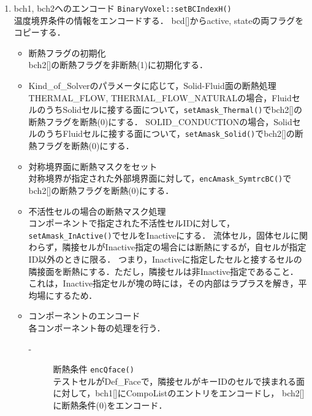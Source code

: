 \begin{enumerate}
%
\vspace{2mm}

\item bch1, bch2へのエンコード \verb|BinaryVoxel::setBCIndexH()|\\
温度境界条件の情報をエンコードする．
bcd[]からactive, stateの両フラグをコピーする．
\vspace{2mm}

\begin{itemize}
\item 断熱フラグの初期化\\
bch2[]の断熱フラグを非断熱(1)に初期化する．
\vspace{2mm}

\item Kind\_of\_Solverのパラメータに応じて，Solid-Fluid面の断熱処理\\
THERMAL\_FLOW, THERMAL\_FLOW\_NATURALの場合，FluidセルのうちSolidセルに接する面について，\verb|setAmask_Thermal()|でbch2[]の断熱フラグを断熱(0)にする．
SOLID\_CONDUCTIONの場合，SolidセルのうちFluidセルに接する面について，\verb|setAmask_Solid()|でbch2[]の断熱フラグを断熱(0)にする．
\vspace{2mm}

\item 対称境界面に断熱マスクをセット\\
対称境界が指定された外部境界面に対して，\verb|encAmask_SymtrcBC()|でbch2[]の断熱フラグを断熱(0)にする．
\vspace{2mm}

\item 不活性セルの場合の断熱マスク処理\\
コンポーネントで指定された不活性セルIDに対して，\verb|setAmask_InActive()|でセルをInactiveにする．
流体セル，固体セルに関わらず，隣接セルがInactive指定の場合には断熱にするが，自セルが指定ID以外のときに限る．
つまり，Inactiveに指定したセルと接するセルの隣接面を断熱にする．ただし，隣接セルは非Inactive指定であること．
これは，Inactive指定セルが塊の時には，その内部はラプラスを解き，平均場にするため．
\vspace{2mm}

\item コンポーネントのエンコード\\
各コンポーネント毎の処理を行う．
\vspace{2mm}

\begin{description}
\item[-] 断熱条件 \verb|encQface()|\\
テストセルがDef\_Faceで，隣接セルがキーIDのセルで挟まれる面に対して，bch1[]にCompoListのエントリをエンコードし，
bch2[]に断熱条件(0)をエンコード．
\vspace{2mm}


\end{description}
\end{itemize}
\end{enumerate}
